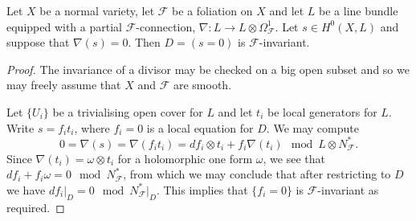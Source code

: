 \documentclass[10pt,a4paper]{amsart}
\begin{document}
\begin{lemma}
\label{lem_partial_connection_invariant}
Let $X$ be a normal variety, let $\mathcal F$ be a foliation on $X$ and let $L$ be a line bundle 
equipped with a partial $\mathcal F$-connection, 
$\nabla\colon L \rightarrow L \otimes \Omega^1_{\mathcal F}$.
Let $s \in H^0(X, L)$ and suppose that $\nabla(s) = 0$.  Then $D = (s = 0)$ is $\mathcal F$-invariant.
\end{lemma}

\begin{proof}
The invariance of a divisor may be checked on a big open subset and so 
we may freely assume that $X$
and $\mathcal F$ are smooth.

Let $\{U_i\}$ be a trivialising open cover for $L$ and let $t_i$ be local generators for $L$.
Write $s = f_it_i$, where $f_i = 0$ is a local equation for $D$.  We may compute  
\[
0 = \nabla(s) = \nabla(f_it_i) = df_i\otimes t_i + f_i\nabla(t_i) \mod L \otimes  N^*_{\mathcal F}.
\]
Since $\nabla(t_i) = \omega\otimes t_i$ for a holomorphic one form $\omega$, we
see that $df_i +f_i\omega = 0 \mod N^*_{\mathcal F}$,
from which we may conclude that after restricting to $D$ we have  $df_i\vert_D = 0 \mod N^*_{\mathcal F}\vert_D$.
This implies that $\{f_i = 0\}$ is $\mathcal F$-invariant
as required. 
\end{proof}
\end{document}
